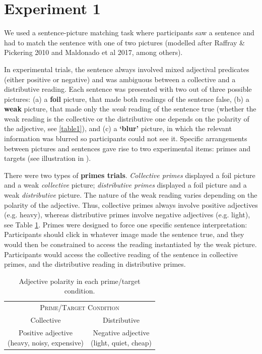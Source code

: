 \documentclass[a4paper, 11pt]{article}
\begin{document}
\section{Experiment 1}
We used a sentence-picture matching task where participants saw a sentence and had to match the sentence with one of two pictures (modelled after Raffray \& Pickering 2010 and Maldonado et al 2017, among others). 

In experimental trials, the sentence always involved mixed adjectival predicates (either positive or negative) and was ambiguous between a collective and a distributive reading. 
Each sentence was presented with two out of three possible pictures: (a) a \textbf{foil} picture, that made both readings of the sentence false, (b) a \textbf{weak} picture, that made only the \emph{weak} reading of the sentence true (whether the weak reading is the collective or the distributive one depends on the polarity of the adjective, see \ref{table1}), and (c) a \textbf{`blur'} picture, in which the relevant information was blurred so participants could not see it. 
Specific arrangements between pictures and sentences gave rise to two experimental items: primes and targets (see illustration in ). 

There were two types of \textbf{primes trials}. \textit{Collective primes} displayed a foil picture and a weak \emph{collective} picture; \textit{distributive primes} displayed a foil picture and a weak \emph{distributive} picture. The nature of the weak reading varies depending on the polarity of the adjective. Thus, collective primes always involve positive adjectives (e.g. heavy), whereas distributive primes involve negative adjectives (e.g. light), see Table \ref{table:adjtype}. 
Primes were designed to force one specific sentence interpretation: Participants should click in whatever image made the sentence true, and they would then be constrained to access the reading instantiated by the weak picture. Participants would access the collective reading of the sentence in collective primes, and the distributive reading in distributive primes. 

\begin{table}[h]
\centering
\begin{tabular}{cc}
\toprule
\multicolumn{2}{c}{\textsc{Prime/Target Condition}}\\[0.1cm]
Collective & Distributive \\
\midrule
\parbox[c]{4.5cm}{Positive adjective \\ (heavy, noisy, expensive)} & \parbox[c]{3.5cm}{Negative adjective \\ (light, quiet, cheap)}  \\
\bottomrule  
\end{tabular}
\caption{Adjective polarity in each prime/target condition.}\label{table:adjtype}
\end{table}
\end{document}
